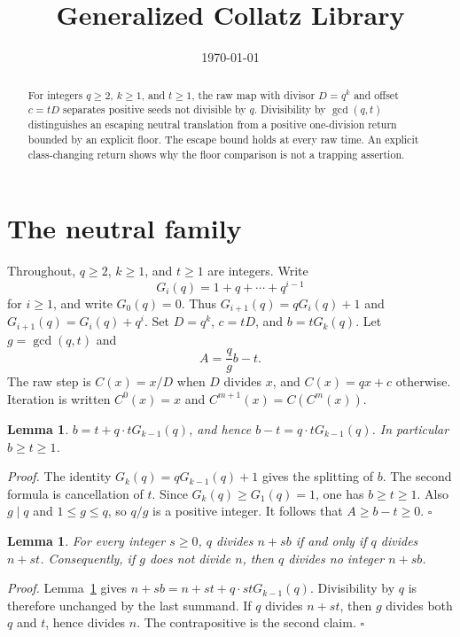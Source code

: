 \documentclass[11pt,letterpaper]{article}
\title{Generalized Collatz Library}
\author{}
\date{\today}
\newtheorem{lemma}[theorem]{Lemma}
\newenvironment{proof}{\noindent\textit{Proof.}}{\hfill\(\square\)}
\begin{document}
\maketitle

\begin{abstract}
For integers \(q\ge 2\), \(k\ge 1\), and \(t\ge 1\), the raw map with divisor \(D=q^k\) and offset \(c=tD\) separates positive seeds not divisible by \(q\). Divisibility by \(\gcd(q,t)\) distinguishes an escaping neutral translation
from a positive one-division return bounded by an explicit floor. The escape
bound holds at every raw time. An explicit class-changing return shows why
the floor comparison is not a trapping assertion.
\end{abstract}

\section{The neutral family}

Throughout, \(q\ge 2\), \(k\ge 1\), and \(t\ge 1\) are integers. Write
\[
G_i(q)=1+q+\cdots+q^{i-1}
\]
for \(i\ge 1\), and write \(G_0(q)=0\). Thus \(G_{i+1}(q)=qG_i(q)+1\) and \(G_{i+1}(q)=G_i(q)+q^i\). Set \(D=q^k\), \(c=tD\), and \(b=tG_k(q)\). Let \(g=\gcd(q,t)\) and
\[
A=\frac{q}{g}b-t.
\]
The raw step is \(C(x)=x/D\) when \(D\) divides \(x\), and \(C(x)=qx+c\) otherwise. Iteration is written \(C^0(x)=x\) and \(C^{m+1}(x)=C(C^m(x))\).

\begin{lemma}
\label{lem:shift}
\(b=t+q\cdot tG_{k-1}(q)\), and hence \(b-t=q\cdot tG_{k-1}(q)\). In particular \(b\ge t\ge 1\).
\end{lemma}

\begin{proof}
The identity \(G_k(q)=qG_{k-1}(q)+1\) gives the splitting of \(b\). The second formula is cancellation of \(t\). Since \(G_k(q)\ge G_1(q)=1\), one has \(b\ge t\ge 1\).
Also \(g\mid q\) and \(1\le g\le q\), so \(q/g\) is a positive integer.
It follows that \(A\ge b-t\ge0\).
\end{proof}

\begin{lemma}
\label{lem:same-div}
For every integer \(s\ge 0\), \(q\) divides \(n+sb\) if and only if \(q\) divides \(n+st\). Consequently, if \(g\) does not divide \(n\), then \(q\) divides no integer \(n+sb\).
\end{lemma}

\begin{proof}
Lemma~\ref{lem:shift} gives \(n+sb=n+st+q\cdot stG_{k-1}(q)\). Divisibility by \(q\) is therefore unchanged by the last summand. If \(q\) divides \(n+st\), then \(g\) divides both \(q\) and \(t\), hence divides \(n\). The contrapositive is the second claim.
\end{proof}
\end{document}
